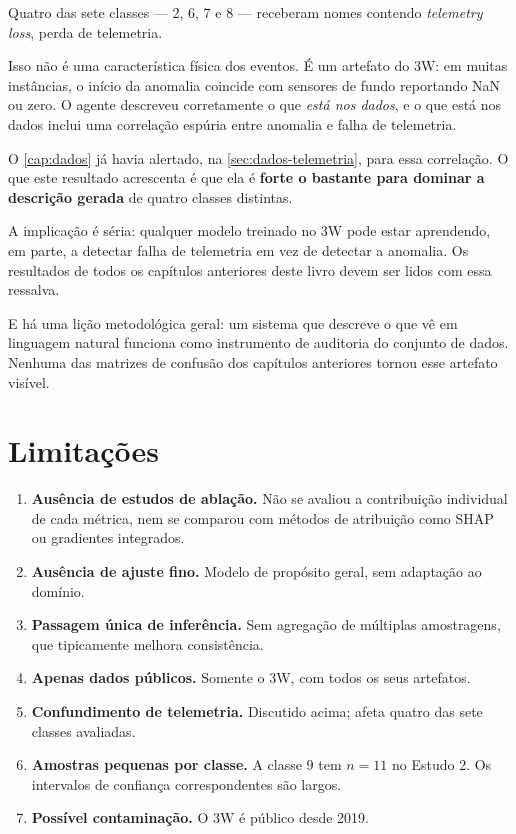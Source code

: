 Quatro das sete classes --- 2, 6, 7 e 8 --- receberam nomes contendo
\emph{telemetry loss}, perda de telemetria.

Isso não é uma característica física dos eventos. É um artefato do 3W: em muitas
instâncias, o início da anomalia coincide com sensores de fundo reportando NaN ou zero.
O agente descreveu corretamente o que \emph{está nos dados}, e o que está nos dados
inclui uma correlação espúria entre anomalia e falha de telemetria.

\begin{destaque}
O \cref{cap:dados} já havia alertado, na \cref{sec:dados-telemetria}, para essa
correlação. O que este resultado acrescenta é que ela é \textbf{forte o bastante para
dominar a descrição gerada} de quatro classes distintas.

A implicação é séria: qualquer modelo treinado no 3W pode estar aprendendo, em parte, a
detectar falha de telemetria em vez de detectar a anomalia. Os resultados de todos os
capítulos anteriores deste livro devem ser lidos com essa ressalva.

E há uma lição metodológica geral: um sistema que descreve o que vê em linguagem natural
funciona como instrumento de auditoria do conjunto de dados. Nenhuma das matrizes de
confusão dos capítulos anteriores tornou esse artefato visível.
\end{destaque}

\section{Limitações}

\begin{enumerate}[leftmargin=*,itemsep=0.4em]
  \item \textbf{Ausência de estudos de ablação.} Não se avaliou a contribuição individual
        de cada métrica, nem se comparou com métodos de atribuição como SHAP ou
        gradientes integrados.
  \item \textbf{Ausência de ajuste fino.} Modelo de propósito geral, sem adaptação ao
        domínio.
  \item \textbf{Passagem única de inferência.} Sem agregação de múltiplas amostragens,
        que tipicamente melhora consistência.
  \item \textbf{Apenas dados públicos.} Somente o 3W, com todos os seus artefatos.
  \item \textbf{Confundimento de telemetria.} Discutido acima; afeta quatro das sete
        classes avaliadas.
  \item \textbf{Amostras pequenas por classe.} A classe 9 tem $n = 11$ no Estudo 2. Os
        intervalos de confiança correspondentes são largos.
  \item \textbf{Possível contaminação.} O 3W é público desde 2019.
\end{enumerate}

